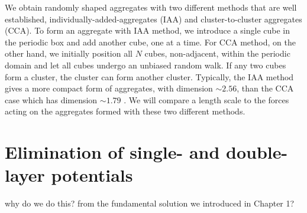 \par
We obtain randomly shaped aggregates with two different methods that are well established, individually-added-aggregates (IAA) and cluster-to-cluster aggregates (CCA). 
To form an aggregate with IAA method, we introduce a single cube in the periodic box and add another cube, one at a time. For CCA method, on the other hand, we initially position all $N$ cubes, non-adjacent, within the periodic domain and let all cubes undergo an unbiased random walk. If any two cubes form a cluster, the cluster can form another cluster.
Typically, the IAA method gives a more compact form of aggregates, with dimension $\sim 2.56$, than the CCA case which has dimension $\sim 1.79$ \cite{witten_diffusion-limited_1981, kaye_random_2008}.
 We will compare a length scale to the forces acting on the aggregates formed with these two different methods.
%
\section{Elimination of single- and double-layer potentials}
{\color{blue} why do we do this? from the fundamental solution we introduced in Chapter 1?}
